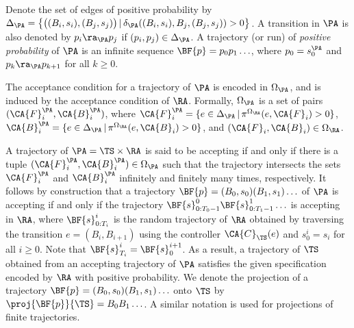Denote the set of edges of positive probability by
$\Delta_\PA = \left\{ \big((B_i, s_i), (B_j, s_j) \big) \,|\, \delta_\PA((B_i, s_i), B_j, (B_j, s_j)) > 0 \right\}$.
A transition in $\PA$ is also denoted by
$p_i \ra_\PA p_j$ if $(p_i, p_j) \in \Delta_\PA$.
A trajectory (or run) of {\em positive probability} of $\PA$
is an infinite sequence $\BF{p} = p_0 p_1 \ldots$, where
$p_0 = s^\PA_0$ and $p_k \ra_\PA p_{k+1}$ for all $k \geq 0$.

The acceptance condition for a trajectory of $\PA$ is encoded in
$\Omega_\PA$, and is induced by the acceptance condition of
$\RA$. Formally, $\Omega_\PA$ is a set of pairs
$(\CA{F}^\PA_i, \CA{B}^\PA_i)$, where
$\CA{F}^\PA_i = \{ e \in \Delta_\PA \,|\, \pi^{\Omega_\RA}(e, \CA{F}_i) > 0\}$,
$\CA{B}^\PA_i = \{ e \in \Delta_\PA \,|\, \pi^{\Omega_\RA}(e, \CA{B}_i) > 0\}$,
and $(\CA{F}_i, \CA{B}_i) \in \Omega_\RA$.

A trajectory of $\PA = \TS \times \RA$ is said to be accepting
if and only if there is a tuple $(\CA{F}^\PA_i, \CA{B}^\PA_i) \in \Omega_\PA$
such that the trajectory intersects the sets $\CA{F}^\PA_i$ and $\CA{B}^\PA_i$
infinitely and finitely many times, respectively.
It follows by construction that a trajectory $\BF{p} = (B_0, s_0) (B_1, s_1) \ldots$ of $\PA$
is accepting if and only if the trajectory $\BF{s}^0_{0:T_0-1} \BF{s}^1_{0:T_1-1} \ldots$
is accepting in $\RA$,
where $\BF{s}^i_{0:T_i}$ is the random trajectory of $\RA$ obtained
by traversing the transition $e = (B_i, B_{i+1})$ using the controller
$\CA{C}_\TS(e)$ and $s^i_{0} = s_i$ for all $i \geq 0$. Note that $\BF{s}^i_{T_i} = \BF{s}^{i+1}_0$.
As a result, a trajectory of $\TS$ obtained from an accepting trajectory of $\PA$
satisfies the given specification encoded by $\RA$ with positive probability.
%
We denote the projection of a trajectory
$\BF{p} = (B_0, s_0) (B_1, s_1) \ldots$ onto $\TS$ by
$\proj{\BF{p}}{\TS} = B_0 B_1 \ldots$.
A similar notation is used for projections of finite trajectories.

